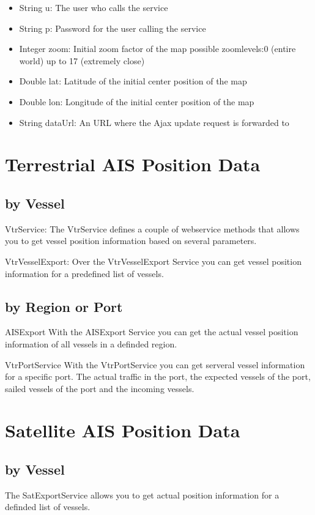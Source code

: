 \begin{itemize}
  \item String u: The user who calls the service
  \item String p: Password for the user calling the service
  \item Integer zoom: Initial zoom factor of the map possible zoomlevels:0 (entire world) up to 17 (extremely close)
  \item Double lat: Latitude of the initial center position of the map
  \item Double lon: Longitude of the initial center position of the map
  \item String dataUrl: An URL where the Ajax update request is forwarded to
\end{itemize}


\section{Terrestrial AIS Position Data}
\subsection{by Vessel}
VtrService:
The VtrService defines a couple of webservice methods that allows you to get vessel position information based on several parameters.




VtrVesselExport:
Over the VtrVesselExport Service you can get vessel position information for a predefined list of vessels. 

\subsection{by Region or Port}
AISExport
With the AISExport Service you can get the actual vessel position information of all vessels in a definded region.

VtrPortService
With the VtrPortService you can get serveral vessel information for a specific port.
The actual traffic in the port, the expected vessels of the port, sailed vessels of the port and the incoming vessels.

\section{Satellite AIS Position Data}
\subsection{by Vessel}
The SatExportService allows you to get actual position information for a definded list of vessels.

